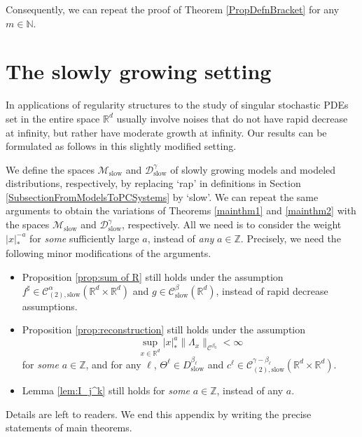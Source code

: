 \documentclass[11pt]{article}
\numberwithin{equation}{section}
\theoremstyle{plain}
\theoremstyle{definition}
\newcommand{\slow}{\mathrm{slow}}
\newcommand{\scrM}{\mathscr{M}}
\newcommand{\bbN}{\mathbb{N}}
\newcommand{\bbR}{\mathbb{R}}
\newcommand{\bbZ}{\mathbb{Z}}
\newcommand{\mcC}{\mathcal{C}}
\newcommand{\mcD}{\mathcal{D}}
\begin{document}
Consequently, we can repeat the proof of Theorem \ref{PropDefnBracket} for any $m\in\bbN$.

\section{The slowly growing setting}
\label{AppendixSlow}

In applications of regularity structures to the study of singular stochastic PDEs set in the entire space $\bbR^d$ usually involve noises that do not have rapid decrease at infinity, but rather have moderate growth at infinity. Our results can be formulated as follows in this slightly modified setting.

We define the spaces $\scrM_{\slow}$ and $\mcD_{\slow}^\gamma$ of slowly growing models and modeled distributions, respectively, by replacing `rap' in definitions in Section \ref{SubsectionFromModelsToPCSystems} by `slow'. We can repeat the same arguments to obtain the variations of Theorems \ref{mainthm1} and \ref{mainthm2} with the spaces $\scrM_{\slow}$ and $\mcD_{\slow}^\gamma$, respectively.
All we need is to consider the weight $|x|_*^{-a}$ for {\it some} sufficiently large $a$, instead of {\it any} $a\in\bbZ$.
Precisely, we need the following minor modifications of the arguments.
\begin{itemize}
\item Proposition \ref{prop:sum of R} still holds under the assumption $f^\sharp\in\mcC_{(2),\slow}^\alpha(\bbR^d\times\bbR^d)$ and $g\in\mcC_{\slow}^\beta(\bbR^d)$, instead of rapid decrease assumptions.
\item Proposition \ref{prop:reconstruction} still holds under the assumption
\[
\sup_{x\in\bbR^d}|x|_*^a\|\Lambda_x\|_{\mcC^{\beta_0}}<\infty
\]
for {\it some} $a\in\bbZ$, and for any $\ell$, $\Theta^\ell\in D_{\slow}^{\beta_\ell}$ and $c^\ell\in\mcC_{(2),\slow}^{\gamma-\beta_\ell}(\bbR^d\times\bbR^d)$.
\item Lemma \ref{lem:I_j^k} still holds for {\it some} $a\in\bbZ$, instead of any $a$.
\end{itemize}
Details are left to readers. We end this appendix by writing the precise statements of main theorems.
\end{document}
